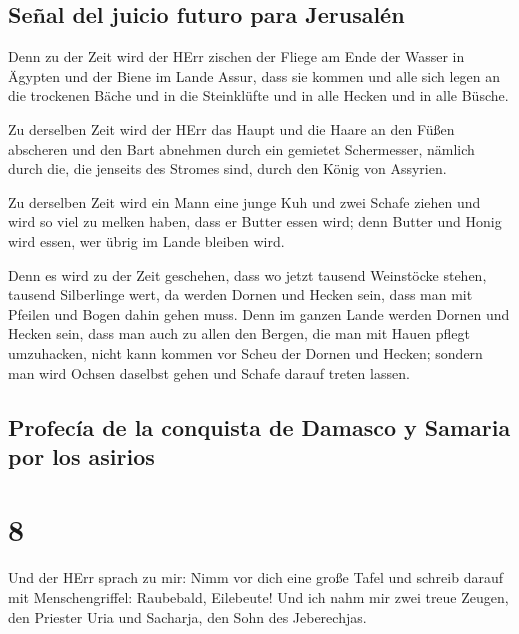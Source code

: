 \hypertarget{seuxf1al-del-juicio-futuro-para-jerusaluxe9n}{%
\subsection{Señal del juicio futuro para
Jerusalén}\label{seuxf1al-del-juicio-futuro-para-jerusaluxe9n}}

 Denn zu der Zeit wird der HErr zischen der Fliege am
Ende der Wasser in Ägypten und der Biene im Lande Assur, 
dass sie kommen und alle sich legen an die trockenen Bäche und in die
Steinklüfte und in alle Hecken und in alle Büsche.

 Zu derselben Zeit wird der HErr das Haupt und die Haare
an den Füßen abscheren und den Bart abnehmen durch ein gemietet
Schermesser, nämlich durch die, die jenseits des Stromes sind, durch den
König von Assyrien.

 Zu derselben Zeit wird ein Mann eine junge Kuh und zwei
Schafe ziehen  und wird so viel zu melken haben, dass er
Butter essen wird; denn Butter und Honig wird essen, wer übrig im Lande
bleiben wird.

 Denn es wird zu der Zeit geschehen, dass wo jetzt
tausend Weinstöcke stehen, tausend Silberlinge wert, da werden Dornen
und Hecken sein,  dass man mit Pfeilen und Bogen dahin
gehen muss. Denn im ganzen Lande werden Dornen und Hecken sein,
 dass man auch zu allen den Bergen, die man mit Hauen
pflegt umzuhacken, nicht kann kommen vor Scheu der Dornen und Hecken;
sondern man wird Ochsen daselbst gehen und Schafe darauf treten lassen.

\hypertarget{profecuxeda-de-la-conquista-de-damasco-y-samaria-por-los-asirios}{%
\subsection{Profecía de la conquista de Damasco y Samaria por los
asirios}\label{profecuxeda-de-la-conquista-de-damasco-y-samaria-por-los-asirios}}

\hypertarget{section-7}{%
\section{8}\label{section-7}}

 Und der HErr sprach zu mir: Nimm vor dich eine große
Tafel und schreib darauf mit Menschengriffel: Raubebald, Eilebeute!
 Und ich nahm mir zwei treue Zeugen, den Priester Uria und
Sacharja, den Sohn des Jeberechjas.

